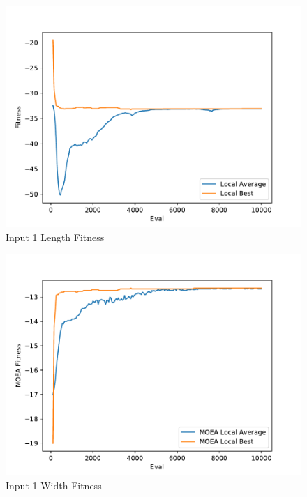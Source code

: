 \documentclass{standalone}
\begin{document}
\begin{figure}[!htb]
	\caption{Input 1 Length Fitness}
	\label{fig:graph_1004}
	\includegraphics[width=\textwidth]{../graphs/graphs/1004.pdf}
\end{figure}


\begin{figure}[!htb]
	\caption{Input 1 Width Fitness}
	\label{fig:graph_1004_moea}
	\includegraphics[width=\textwidth]{../graphs/graphs/1004_moea.pdf}
\end{figure}
\end{document}

